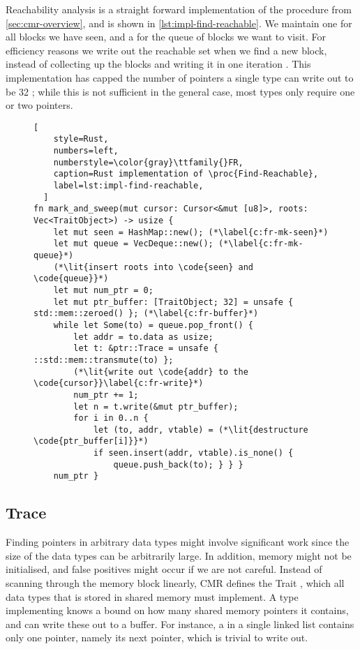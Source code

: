 Reachability analysis is a straight forward implementation of the  procedure
from \cref{sec:cmr-overview}, and is shown in \cref{lst:impl-find-reachable}. We maintain one
  for all blocks we have seen, and a 
 for the queue of blocks we want to visit. For efficiency reasons
we write out the reachable set when we find a new block, instead of collecting up the blocks and
writing it in one iteration . This implementation has capped the
number of pointers a single type can write out to be 32 ; while this
is not sufficient in the general case, most types only require one or two pointers.



\begin{figure}[ht]
  \begin{lstlisting}[
    style=Rust,
    numbers=left,
    numberstyle=\color{gray}\ttfamily{}FR,
    caption=Rust implementation of \proc{Find-Reachable},
    label=lst:impl-find-reachable,
  ]
fn mark_and_sweep(mut cursor: Cursor<&mut [u8]>, roots: Vec<TraitObject>) -> usize {
    let mut seen = HashMap::new(); (*\label{c:fr-mk-seen}*)
    let mut queue = VecDeque::new(); (*\label{c:fr-mk-queue}*)
    (*\lit{insert roots into \code{seen} and \code{queue}}*)
    let mut num_ptr = 0;
    let mut ptr_buffer: [TraitObject; 32] = unsafe { std::mem::zeroed() }; (*\label{c:fr-buffer}*)
    while let Some(to) = queue.pop_front() {
        let addr = to.data as usize;
        let t: &ptr::Trace = unsafe { ::std::mem::transmute(to) };
        (*\lit{write out \code{addr} to the \code{cursor}}\label{c:fr-write}*)
        num_ptr += 1;
        let n = t.write(&mut ptr_buffer);
        for i in 0..n {
            let (to, addr, vtable) = (*\lit{destructure \code{ptr_buffer[i]}}*)
            if seen.insert(addr, vtable).is_none() {
                queue.push_back(to); } } }
    num_ptr }
\end{lstlisting}
\end{figure}


\subsection{Trace}

Finding pointers in arbitrary data types might involve significant work since the size of the data
types can be arbitrarily large. In addition, memory might not be initialised, and false positives
might occur if we are not careful. Instead of scanning through the memory block linearly, CMR
defines the Trait , which all data types that is stored in shared memory must
implement.  A type implementing  knows a bound on how many shared memory pointers it
contains, and can write these out to a buffer. For instance, a  in a single linked list
contains only one pointer, namely its next pointer, which is trivial to write out.

